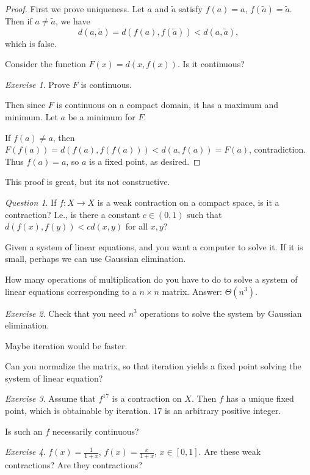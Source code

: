\documentclass{article}
\theoremstyle{remark}
\newtheorem*{question}{Question}
\newtheorem{exercise}{Exercise}
\begin{document}
\begin{proof}
   \newcommand\til[1]{\tilde{#1}}
   First we prove uniqueness. Let $a$ and $\til{a}$ satisfy
    $f(a)=a$, $f(\til{a}) = \til{a}$. Then if $a\ne \til{a}$, 
    we have
    \[ d(a,\til{a}) = d(f(a),f(\til{a})) < d(a,\til{a}), \]
    which is false. 

    Consider the function $F(x)=d(x,f(x))$. Is it continuous?
    \begin{exercise}
        Prove $F$ is continuous.
    \end{exercise}

    Then since $F$ is continuous on a compact domain, it has
    a maximum and minimum. Let $a$ be a minimum for $F$.

    If $f(a)\ne a$,
    then $F(f(a)) = d(f(a),f(f(a))) < d(a,f(a)) = F(a)$,
    contradiction. Thus $f(a)=a$, so $a$ is a fixed point,
    as desired.
\end{proof}

This proof is great, but its not constructive.

\begin{question}
    If $f:X\to X$ is a weak contraction on a compact space, is
    it a contraction? I.e., is there a constant $c\in (0,1)$
    such that $d(f(x),f(y)) < cd(x,y)$ for all $x,y$?
\end{question}

Given a system of linear equations, and you want a computer
to solve it. If it is small, perhaps we can use Gaussian 
elimination. 

How many operations of multiplication do you have to do to solve
a system of linear equations corresponding to a $n\times n$
matrix. Answer: $\Theta(n^3)$.

\begin{exercise}
    Check that you need $n^3$ operations to solve the system
    by Gaussian elimination.
\end{exercise}

Maybe iteration would be faster.

Can you normalize the matrix, so that iteration yields
a fixed point solving the system of linear equation?

\begin{exercise}
    Assume that $f^{17}$ is a contraction on $X$. Then
    $f$ has a unique fixed point, which is obtainable by 
    iteration. $17$ is an arbitrary positive integer.

    Is such an $f$ necessarily continuous?
\end{exercise}

\begin{exercise}
    $f(x)=\frac{1}{1+x}$, $f(x) = \frac{x}{1+x}$, $x\in [0,1]$.
    Are these weak contractions? Are they contractions?
\end{exercise}
\end{document}
